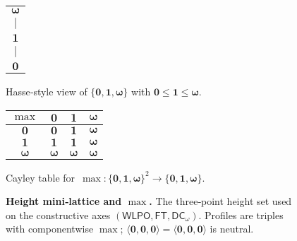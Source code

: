 \documentclass[11pt]{article}
\newcommand{\WLPO}{\mathsf{WLPO}}
\newcommand{\FT}{\mathsf{FT}}
\newcommand{\DCw}{\mathsf{DC}_{\omega}}
\newcommand{\hzero}{\mathbf{0}}
\newcommand{\hone}{\mathbf{1}}
\newcommand{\homega}{\boldsymbol{\omega}}
\newcommand{\allzero}{\langle \hzero,\hzero,\hzero\rangle}
\theoremstyle{plain}
\theoremstyle{definition}
\theoremstyle{remark}
\begin{document}
\begin{figure}[t]
  \centering
  \begin{minipage}[t]{0.40\linewidth}
    \centering
    \vspace{0.2em}
    \setlength{\tabcolsep}{6pt}
    \begin{tabular}{c}
      $\homega$ \\[-0.15em]
      \rule{0pt}{1.2em}$\mid$ \\[-0.15em]
      $\hone$ \\[-0.15em]
      \rule{0pt}{1.2em}$\mid$ \\[-0.15em]
      $\hzero$
    \end{tabular}

    \vspace{0.7em}
    \small Hasse‑style view of $\{\hzero,\hone,\homega\}$ with $\hzero\le \hone\le \homega$.
  \end{minipage}\hfill
  \begin{minipage}[t]{0.55\linewidth}
    \centering
    \setlength{\tabcolsep}{8pt}
    \renewcommand{\arraystretch}{1.2}
    \begin{tabular}{c|ccc}
      $\max$ & $\hzero$ & $\hone$ & $\homega$ \\\hline
      $\hzero$ & $\hzero$ & $\hone$ & $\homega$ \\
      $\hone$  & $\hone$  & $\hone$ & $\homega$ \\
      $\homega$ & $\homega$ & $\homega$ & $\homega$ \\
    \end{tabular}

    \vspace{0.7em}
    \small Cayley table for $\,\max:\{\hzero,\hone,\homega\}^2\!\to\!\{\hzero,\hone,\homega\}$.
  \end{minipage}

  \caption{\textbf{Height mini‑lattice and $\max$.}
  The three‑point height set used on the constructive axes $(\WLPO,\FT,\DCw)$.
  Profiles are triples with componentwise $\max$; $\allzero=\langle\hzero,\hzero,\hzero\rangle$ is neutral.}
  \label{fig:height-lattice}
\end{figure}
\end{document}

